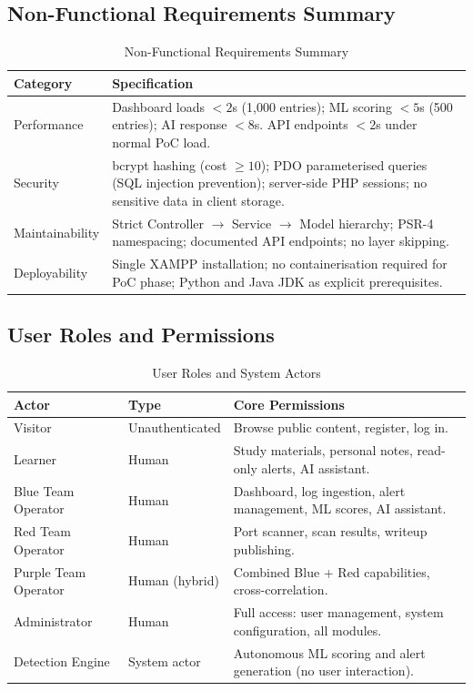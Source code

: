 \documentclass[12pt,a4paper]{article}
\begin{document}
\subsection{Non-Functional Requirements Summary}
\begin{table}[H]
  \centering
  \renewcommand{\arraystretch}{1.25}
  \begin{tabular}{@{}L{3cm} p{11.2cm}@{}}
    \toprule
    \textbf{Category} & \textbf{Specification} \\
    \midrule
    Performance
      & Dashboard loads $<2$s (1,000 entries); ML scoring $<5$s (500 entries);
        AI response $<8$s. API endpoints $<2$s under normal PoC load. \\
    Security
      & bcrypt hashing (cost $\geq 10$); PDO parameterised queries (SQL injection
        prevention); server-side PHP sessions; no sensitive data in client storage. \\
    Maintainability
      & Strict Controller $\to$ Service $\to$ Model hierarchy; PSR-4 namespacing;
        documented API endpoints; no layer skipping. \\
    Deployability
      & Single XAMPP installation; no containerisation required for PoC phase;
        Python and Java JDK as explicit prerequisites. \\
    \bottomrule
  \end{tabular}
  \caption{Non-Functional Requirements Summary}
\end{table}

\subsection{User Roles and Permissions}
\begin{table}[H]
  \centering
  \renewcommand{\arraystretch}{1.25}
  \begin{tabular}{@{}L{3.4cm} L{2.8cm} p{8cm}@{}}
    \toprule
    \textbf{Actor} & \textbf{Type} & \textbf{Core Permissions} \\
    \midrule
    Visitor                & Unauthenticated  & Browse public content, register, log in. \\
    Learner                & Human            & Study materials, personal notes, read-only alerts, AI assistant. \\
    Blue Team Operator     & Human            & Dashboard, log ingestion, alert management, ML scores, AI assistant. \\
    Red Team Operator      & Human            & Port scanner, scan results, writeup publishing. \\
    Purple Team Operator   & Human (hybrid)   & Combined Blue + Red capabilities, cross-correlation. \\
    Administrator          & Human            & Full access: user management, system configuration, all modules. \\
    Detection Engine       & System actor     & Autonomous ML scoring and alert generation (no user interaction). \\
    \bottomrule
  \end{tabular}
  \caption{User Roles and System Actors}
\end{table}
\end{document}
